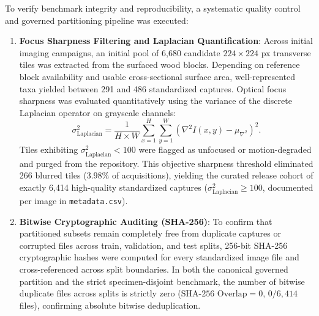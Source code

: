 \documentclass[a4paper,fleqn,12pt]{cas-sc}
\begin{document}
To verify benchmark integrity and reproducibility, a systematic quality control and governed partitioning pipeline was executed:
\begin{enumerate}[leftmargin=*,itemsep=2pt,topsep=2pt]
    \item \textbf{Focus Sharpness Filtering and Laplacian Quantification}: Across initial imaging campaigns, an initial pool of 6,680 candidate $224 \times 224$ px transverse tiles was extracted from the surfaced wood blocks. Depending on reference block availability and usable cross-sectional surface area, well-represented taxa yielded between 291 and 486 standardized captures. Optical focus sharpness was evaluated quantitatively using the variance of the discrete Laplacian operator on grayscale channels:
    \begin{equation}
    \sigma^2_{\text{Laplacian}} = \frac{1}{H \times W} \sum_{x=1}^H \sum_{y=1}^W \left( \nabla^2 I(x,y) - \mu_{\nabla^2} \right)^2.
    \end{equation}
    Tiles exhibiting $\sigma^2_{\text{Laplacian}} < 100$ were flagged as unfocused or motion-degraded and purged from the repository. This objective sharpness threshold eliminated 266 blurred tiles ($3.98\%$ of acquisitions), yielding the curated release cohort of exactly 6,414 high-quality standardized captures ($\sigma^2_{\text{Laplacian}} \ge 100$, documented per image in \texttt{metadata.csv}).
    \item \textbf{Bitwise Cryptographic Auditing (SHA-256)}: To confirm that partitioned subsets remain completely free from duplicate captures or corrupted files across train, validation, and test splits, 256-bit SHA-256 cryptographic hashes were computed for every standardized image file and cross-referenced across split boundaries. In both the canonical governed partition and the strict specimen-disjoint benchmark, the number of bitwise duplicate files across splits is strictly zero ($\text{SHA-256 Overlap} = 0$, $0/6,414$ files), confirming absolute bitwise deduplication.

\end{enumerate}
\end{document}
